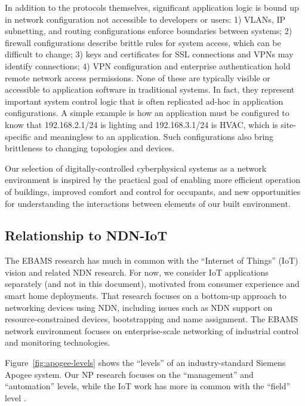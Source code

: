 In addition to the protocols themselves, significant application logic is bound up in network configuration not accessible to developers or users: 1) VLANs, IP subnetting, and routing configurations enforce boundaries between systems;
2) firewall configurations describe brittle rules for system access, which can be difficult to change; 3) keys and certificates for SSL connections and VPNs may identify connections; 4) VPN configuration and enterprise authentication hold remote network access permissions. None of these are typically visible or accessible to application software in traditional systems. In fact, they represent important system control logic that is often replicated ad-hoc in application configurations. A simple example is how an application must be configured to know that 192.168.2.1/24 is lighting and 192.168.3.1/24 is HVAC, which is site-specific and meaningless to an application.  Such configurations also bring brittleness to changing topologies and devices.

Our selection of digitally-controlled cyberphysical systems  as a
network environment is inspired by the practical goal of enabling more 
efficient operation of buildings, improved comfort and control for occupants, 
and new opportunities for understanding the interactions between elements 
of our built environment. 

\subsection{Relationship to NDN-IoT}

The EBAMS research has much in common with the ``Internet of Things'' (IoT) vision and related NDN research.  For now, we consider IoT applications separately (and not in this document), motivated from consumer experience and smart home deployments.  That research focuses on a bottom-up approach to networking devices using NDN, including issues such as NDN support on resource-constrained devices, bootstrapping and name assignment.  The EBAMS network environment focuses on enterprise-scale networking of industrial control and monitoring technologies. 

Figure~\ref{fig:apogee-levels} shows the ``levels'' of an industry-standard Siemens Apogee system.  Our NP research focuses on the ``management'' and ``automation'' levels, while the IoT work has more in common with the ``field'' level .

